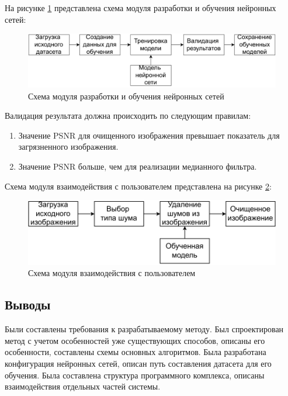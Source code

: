 На рисунке \ref{contruct::module1} представлена схема модуля разработки и обучения нейронных сетей:
\FloatBarrier
\begin{figure}[h]	
	\begin{center}
		\includegraphics[width=\linewidth]{inc/pdf/module1.pdf}
	\end{center}
	\captionsetup{justification=centering}
	\caption{Схема модуля разработки и обучения нейронных сетей}
	\label{contruct::module1}
\end{figure}
\FloatBarrier

Валидация результата должна происходить по следующим правилам:
\begin{enumerate}
	\item Значение PSNR для очищенного изображения превышает показатель для загрязненного изображения.
	\item Значение PSNR больше, чем для реализации медианного фильтра.
\end{enumerate}

\newpage
Схема модуля взаимодействия с пользователем представлена на рисунке \ref{contruct::module2}:
\FloatBarrier
\begin{figure}[h]	
	\begin{center}
		\includegraphics[width=\linewidth]{inc/pdf/module2.pdf}
	\end{center}
	\captionsetup{justification=centering}
	\caption{Схема модуля взаимодействия с пользователем}
	\label{contruct::module2}
\end{figure}
\FloatBarrier

\subsection*{Выводы}
Были составлены требования к разрабатываемому методу.
Был спроектирован метод с учетом особенностей уже существующих способов, описаны его особенности, составлены схемы основных алгоритмов.
Была разработана конфигурация нейронных сетей, описан путь составления датасета для его обучения.
Была составлена структура программного комплекса, описаны взаимодействия отдельных частей системы.